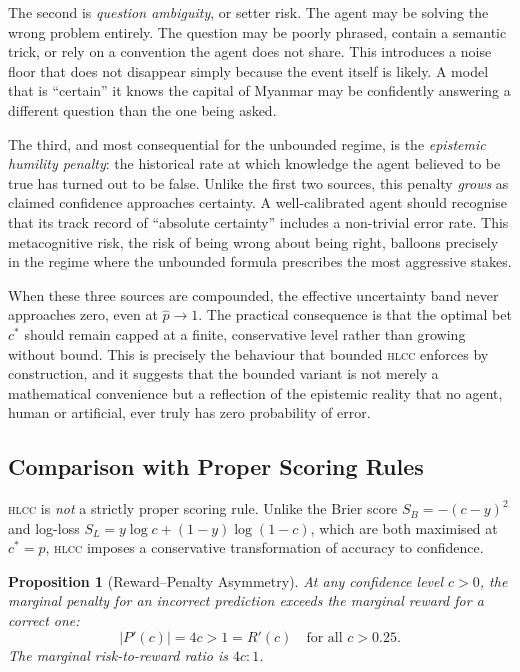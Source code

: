 \documentclass[11pt,a4paper]{article}
\newtheorem{proposition}{Proposition}
\newcommand{\hlcc}{\textsc{hlcc}}
\newcommand{\cstar}{c^{*}}
\begin{document}
The second is \emph{question ambiguity}, or setter risk.  The agent
may be solving the wrong problem entirely.  The question may be poorly
phrased, contain a semantic trick, or rely on a convention the agent
does not share.  This introduces a noise floor
that does not disappear simply because the event itself is likely.
A model that is ``certain'' it knows the capital of Myanmar may be
confidently answering a different question than the one being asked.

The third, and most consequential for the unbounded regime, is the
\emph{epistemic humility penalty}: the historical rate at which
knowledge the agent believed to be true has turned out to be false.
Unlike the first two sources, this penalty \emph{grows} as claimed
confidence approaches certainty.  A well-calibrated agent should
recognise that its track record of ``absolute certainty'' includes a
non-trivial error rate.  This metacognitive risk, the risk of being
wrong about being right, balloons precisely in the regime
where the unbounded formula prescribes the most aggressive stakes.

When these three sources are compounded, the effective uncertainty
band never approaches zero, even at $\hat{p} \to 1$.  The practical
consequence is that the optimal bet $\cstar$ should remain capped at
a finite, conservative level rather than growing without bound.  This
is precisely the behaviour that bounded \hlcc{} enforces by
construction, and it suggests that the bounded variant is not merely
a mathematical convenience but a reflection of the epistemic reality
that no agent, human or artificial, ever truly has zero probability
of error.

\subsection{Comparison with Proper Scoring Rules}

\hlcc{} is \emph{not} a strictly proper scoring rule.  Unlike the Brier
score $S_B = -(c-y)^{2}$ and log-loss
$S_L = y\log c + (1-y)\log(1-c)$, which are both maximised at $\cstar = p$,
\hlcc{} imposes a conservative transformation of accuracy to confidence.

\begin{proposition}[Reward--Penalty Asymmetry]
  At any confidence level $c > 0$, the marginal penalty for an incorrect
  prediction exceeds the marginal reward for a correct one:
  \begin{equation}
    |P'(c)| = 4c > 1 = R'(c) \quad \text{for all } c > 0.25.
  \end{equation}
  The marginal risk-to-reward ratio is $4c : 1$.
\end{proposition}
\end{document}
